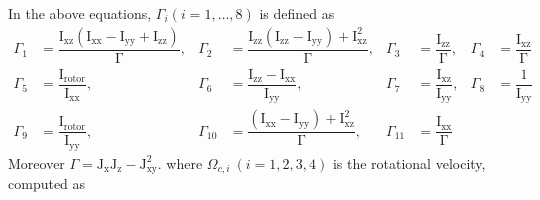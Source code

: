 \documentclass[3p]{elsarticle}
\begin{document}
In the above equations, $\Gamma_i (i = 1, \ldots, 8)$ is defined as
\begin{equation}
    \begin{aligned}
        \Gamma_1 &= \dfrac{\mathrm{I}_{\text{xz}}\left(\mathrm{I}_{\text{xx}} - \mathrm{I}_{\text{yy}} + \mathrm{I}_{\text{zz}}\right)}{\mathrm{\Gamma}}, & \Gamma_2 &= \dfrac{\mathrm{I}_{\text{zz}}\left(\mathrm{I}_{\text{zz}} - \mathrm{I}_{\text{yy}}\right)+\mathrm{I}_{\text{xz}}^2}{\mathrm{\Gamma}}, & \Gamma_3 &= \dfrac{\mathrm{I}_{\text{zz}}}{\mathrm{\Gamma}}, & \Gamma_4 &= \dfrac{\mathrm{I}_{\text{xz}}}{\mathrm{\Gamma}} \\
        \Gamma_5 &= \dfrac{\mathrm{I}_{\text{rotor}}}{\mathrm{I}_{\text{xx}}}, & \Gamma_6 &= \dfrac{\mathrm{I}_{\text{zz}}-\mathrm{I}_{\text{xx}}}{\mathrm{I}_{\text{yy}}}, & \Gamma_7 &= \dfrac{\mathrm{I}_{\text{xz}}}{\mathrm{I}_{\text{yy}}}, & \Gamma_8 &= \dfrac{1}{\mathrm{I}_{\text{yy}}} \\
        \Gamma_9 &= \dfrac{\mathrm{I}_{\text{rotor}}}{\mathrm{I}_{\text{yy}}}, & \Gamma_{10} &= \dfrac{\left(\mathrm{I}_{\text{xx}}-\mathrm{I}_{\text{yy}}\right)+\mathrm{I}_{\text{xz}}^2}{\mathrm{\Gamma}}, & \Gamma_{11} &= \dfrac{\mathrm{I}_{\text{xx}}}{\mathrm{\Gamma}} & &
    \end{aligned}
\end{equation}
Moreover $\Gamma = \mathrm{J}_{\text{x}}\mathrm{J}_{\text{z}} - \mathrm{J}_{\text{xy}}^2$.
where $\Omega_{c, i}~(i=1, 2, 3, 4)$ is the rotational velocity, computed as
\end{document}
